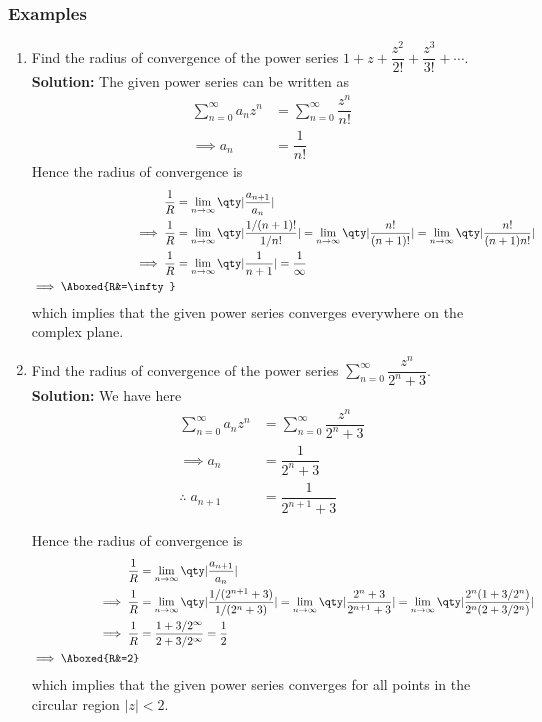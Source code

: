 		\subsubsection*{Examples}
			\begin{enumerate}
				\item Find the radius of convergence of the power series $1+z+\dfrac{z^2}{2!}+\dfrac{z^3}{3!}+\cdots$.\\
				\textbf{Solution:} The given power series can be written as
				\begin{align*}
					\sum_{n=0}^{\infty}{a_nz^n}&=\sum_{n=0}^{\infty}{\dfrac{z^n}{n!}} \\
					\implies a_n&=\dfrac{1}{n!}
				\end{align*}
				Hence the radius of convergence is
				\begin{align*}
					\dfrac{1}{R}&=\lim_{n\to\infty}{\qty|\dfrac{a_{n+1}}{a_n}|} \\
					\implies\dfrac{1}{R}&=\lim_{n\to\infty}{\qty|\dfrac{{1}/{(n+1)!}}{{1}/{n!}}|}=\lim_{n\to\infty}{\qty|\dfrac{n!}{(n+1)!}|}=\lim_{n\to\infty}{\qty|\dfrac{n!}{(n+1)n!}|} \\
					\implies\dfrac{1}{R}&=\lim_{n\to\infty}{\qty|\dfrac{1}{n+1}|}=\dfrac{1}{\infty} \\
					\implies\Aboxed{R&=\infty}
				\end{align*}
				which implies that the given power series converges everywhere on the complex plane.
				
				\item Find the radius of convergence of the power series $\sum_{n=0}^{\infty}{\dfrac{z^n}{2^n+3}}$.\\
				\textbf{Solution:} We have here
				\begin{align*}
					\sum_{n=0}^{\infty}{a_nz^n}&=\sum_{n=0}^{\infty}{\dfrac{z^n}{2^n+3}} \\
					\implies a_n&=\dfrac{1}{2^n+3} \\
					\therefore\;a_{n+1}&=\dfrac{1}{2^{n+1}+3}
				\end{align*}
				
				Hence the radius of convergence is
				\begin{align*}
					\dfrac{1}{R}&=\lim_{n\to\infty}{\qty|\dfrac{a_{n+1}}{a_n}|} \\
					\implies\dfrac{1}{R}&=\lim_{n\to\infty}{\qty|\dfrac{{1}/(2^{n+1}+3)}{{1}/(2^n+3)}|}=\lim_{n\to\infty}{\qty|\dfrac{2^n+3}{2^{n+1}+3}|}=\lim_{n\to\infty}{\qty|\dfrac{2^n(1+3/2^n)}{2^n(2+3/2^n)}|} \\
					\implies\dfrac{1}{R}&=\dfrac{1+3/2^\infty}{2+3/2^\infty}=\dfrac{1}{2} \\
					\implies\Aboxed{R&=2}
				\end{align*}
				which implies that the given power series converges for all points in the circular region $|z|<2$.
				

\end{enumerate}
